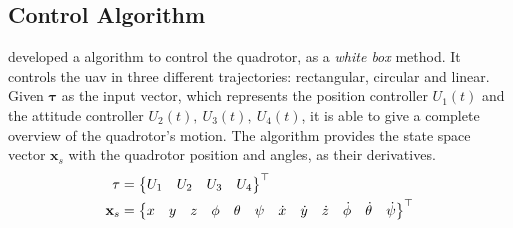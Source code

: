 \subsection{Control Algorithm}

\citet{geronel2023} developed a \matlab algorithm to control the quadrotor, as a \emph{white box} method. 
It controls the \gls*{uav} in three different trajectories: rectangular, circular and linear.
Given \(\mathbf{\tau}\) as the input vector, which represents the position controller \(U_1(t)\) and the attitude controller \(U_2(t),\ U_3(t),\ U_4(t)\), it is able to give a complete overview of the quadrotor's motion.
The algorithm provides the state space vector \(\mathbf{x}_s\) with the quadrotor position and angles, as their derivatives.
%
\begin{align}
    \mathbf{\tau} &= \begin{Bmatrix}
        U_1 & U_2 & U_3 & U_4
    \end{Bmatrix}^{\top} \\
    \setcounter{MaxMatrixCols}{13}
    \mathbf{x}_s &=
    \begin{Bmatrix}
        x&y&z&\phi&\theta&\psi&\dot{x}&\dot{y}&\dot{z}&\dot{\phi}&\dot{\theta}&\dot{\psi}
    \end{Bmatrix}^{\top}
    \label{eq:xs_vector_matlab}
\end{align}